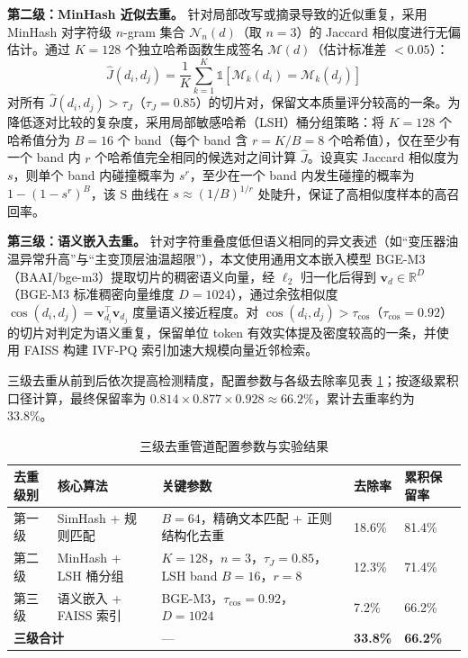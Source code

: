 \documentclass[fontset=fandol,type=master,campus=shenzhen,etitleauto=true]{hithesisbook}
\begin{document}
\textbf{第二级：MinHash 近似去重。} 针对局部改写或摘录导致的近似重复，采用 MinHash 对字符级 $n$-gram 集合 $\mathcal{N}_n(d)$（取 $n = 3$）的 Jaccard 相似度进行无偏估计\cite{ref61}。通过 $K = 128$ 个独立哈希函数生成签名 $\mathcal{M}(d)$（估计标准差 $< 0.05$）：
\begin{equation}
\hat{J}(d_i, d_j) = \frac{1}{K} \sum_{k=1}^{K} \mathbb{1}\left[\mathcal{M}_k(d_i) = \mathcal{M}_k(d_j)\right]
\end{equation}
对所有 $\hat{J}(d_i, d_j) > \tau_J$（$\tau_J = 0.85$）的切片对，保留文本质量评分较高的一条。为降低逐对比较的复杂度，采用局部敏感哈希（LSH）桶分组策略\cite{ref62}：将 $K=128$ 个哈希值分为 $B=16$ 个 band（每个 band 含 $r = K/B = 8$ 个哈希值），仅在至少有一个 band 内 $r$ 个哈希值完全相同的候选对之间计算 $\hat{J}$。设真实 Jaccard 相似度为 $s$，则单个 band 内碰撞概率为 $s^r$，至少在一个 band 内发生碰撞的概率为 $1 - (1 - s^r)^B$，该 S 曲线在 $s \approx (1/B)^{1/r}$ 处陡升，保证了高相似度样本的高召回率。

\textbf{第三级：语义嵌入去重。} 针对字符重叠度低但语义相同的异文表述（如``变压器油温异常升高''与``主变顶层油温超限''），本文使用通用文本嵌入模型 BGE-M3（BAAI/bge-m3）提取切片的稠密语义向量，经 $\ell_2$ 归一化后得到 $\mathbf{v}_d \in \mathbb{R}^{D}$（BGE-M3 标准稠密向量维度 $D = 1024$），通过余弦相似度 $\cos(d_i, d_j) = \mathbf{v}_{d_i}^{\top} \mathbf{v}_{d_j}$ 度量语义接近程度。对 $\cos(d_i, d_j) > \tau_{\cos}$（$\tau_{\cos} = 0.92$）的切片对判定为语义重复，保留单位 token 有效实体提及密度较高的一条，并使用 FAISS 构建 IVF-PQ 索引加速大规模向量近邻检索\cite{ref63}。

三级去重从前到后依次提高检测精度，配置参数与各级去除率见表 \ref{tab:dedup-pipeline}；按逐级累积口径计算，最终保留率为 $0.814 \times 0.877 \times 0.928 \approx 66.2\%$，累计去重率约为 33.8\%。

\begin{table}[htbp]
\centering
\caption{三级去重管道配置参数与实验结果}
\label{tab:dedup-pipeline}
\small
\setlength{\tabcolsep}{4pt}
\begin{tabular}{p{2.0cm}p{3.4cm}p{4.4cm}p{1.9cm}p{1.9cm}}
\toprule
\textbf{去重级别} & \textbf{核心算法} & \textbf{关键参数} & \textbf{去除率} & \textbf{累积保留率} \\
\midrule
第一级 & SimHash + 规则匹配 & $B = 64$，精确文本匹配 + 正则结构化去重 & 18.6\% & 81.4\% \\
\midrule
第二级 & MinHash + LSH 桶分组 & $K = 128$，$n = 3$，$\tau_J = 0.85$，LSH band $B = 16$，$r = 8$ & 12.3\% & 71.4\% \\
\midrule
第三级 & 语义嵌入 + FAISS 索引 & BGE-M3，$\tau_{\cos} = 0.92$，$D = 1024$ & 7.2\% & 66.2\% \\
\midrule
\multicolumn{2}{l}{\textbf{三级合计}} & --- & \textbf{33.8\%} & \textbf{66.2\%} \\
\bottomrule
\end{tabular}
\end{table}
\end{document}
